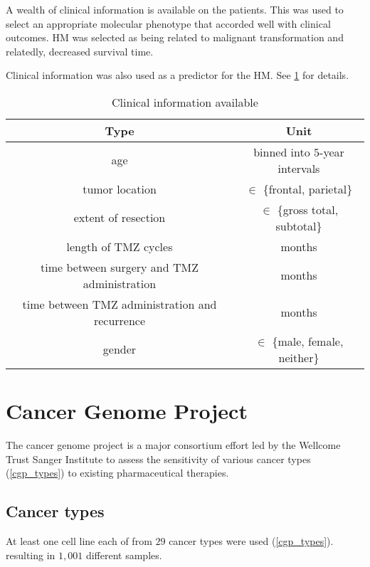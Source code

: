 A wealth of clinical information is available on the patients. This
was used to select an appropriate molecular phenotype that accorded
well with clinical outcomes. HM was selected as being
related to malignant transformation and relatedly, decreased survival
time.

Clinical information was also used as a predictor for the HM. See
\ref{avail_clin} for details.


  \begin{table}
    \begin{center}
      \begin{tabular}{|c|c|} \hline \textbf{Type} &
        \textbf{Unit} \\ \hline
        age & binned into $5$-year intervals \\
        tumor location & $\in$ \{frontal, parietal\} \\
        extent of resection & $\in$ \{gross total, subtotal\} \\
        length of TMZ cycles & months \\
        time between surgery and TMZ administration & months \\
        time between TMZ administration and recurrence & months \\
        gender & $\in$ \{male, female, neither\}\\ \hline 
      \end{tabular}
    \end{center}
    \caption{Clinical information available} \label{avail_clin}
  \end{table}


\section{Cancer Genome Project}

The cancer genome project is a major consortium effort led by the Wellcome
Trust Sanger Institute to assess the sensitivity of various cancer
types (\ref{cgp_types}) to existing pharmaceutical therapies.


\subsection{Cancer types}

At least one cell line each of from $29$ cancer types were used (\ref{cgp_types}).
resulting in $1,001$ different samples.


